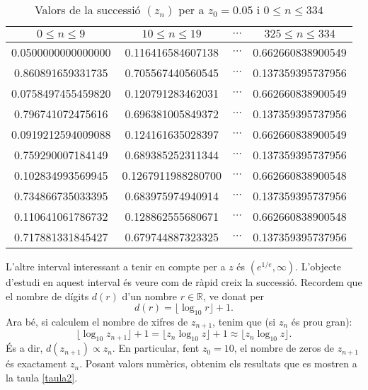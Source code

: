 \documentclass[11pt,a4paper]{article}
\theoremstyle{definition}
\begin{document}
\begin{table}[ht]
    \def\arraystretch{1}
    \centering
    \begin{tabular}{|c||c||c||c|}
        \hline
        $0\leq n\leq 9$    & $10\leq n\leq 19$  & $\cdots$ & $325\leq n\leq 334$ \\
        \hline
        \hline
        0.0500000000000000 & 0.116416584607138  & $\cdots$ & 0.662660838900549   \\
        \hline
        0.860891659331735  & 0.705567440560545  & $\cdots$ & 0.137359395737956   \\
        \hline
        0.0758497455459820 & 0.120791283462031  & $\cdots$ & 0.662660838900549   \\
        \hline
        0.796741072475616  & 0.696381005849372  & $\cdots$ & 0.137359395737956   \\
        \hline
        0.0919212594009088 & 0.124161635028397  & $\cdots$ & 0.662660838900549   \\
        \hline
        0.759290007184149  & 0.689385252311344  & $\cdots$ & 0.137359395737956   \\
        \hline
        0.102834993569945  & 0.1267911988280700 & $\cdots$ & 0.662660838900548   \\
        \hline
        0.734866735033395  & 0.683975974940914  & $\cdots$ & 0.137359395737956   \\
        \hline
        0.110641061786732  & 0.128862555680671  & $\cdots$ & 0.662660838900548   \\
        \hline
        0.717881331845427  & 0.679744887323325  & $\cdots$ & 0.137359395737956   \\
        \hline
    \end{tabular}
    \caption{Valors de la successió $(z_n)$ per a $z_0=0.05$ i $0\leq n\leq 334$}
    \label{taula1}
\end{table}
L'altre interval interessant a tenir en compte per a $z$ és $(e^{1/e},\infty)$. L'objecte d'estudi en aquest interval és veure com de ràpid creix la successió. Recordem que el nombre de dígits $d(r)$ d'un nombre $r\in\mathbb{R}$, ve donat per $$d(r)=\lfloor\log_{10}r\rfloor+1.$$ Ara bé, si calculem el nombre de xifres de $z_{n+1}$, tenim que (si $z_n$ és prou gran): $$\lfloor\log_{10}z_{n+1}\rfloor+1=\lfloor z_{n}\log_{10}z\rfloor+1\approx \lfloor z_{n}\log_{10}z\rfloor.$$ És a dir, $d(z_{n+1})\propto z_n$. En particular, fent $z_0=10$, el nombre de zeros de $z_{n+1}$ és exactament $z_n$. Posant valors numèrics, obtenim els resultats que es mostren a la taula \ref{taula2}.
\end{document}
